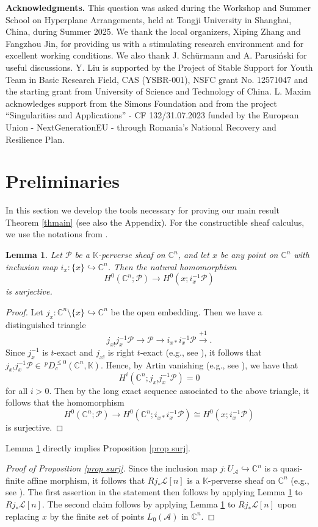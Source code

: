 \documentclass[12pt,leqno,twoside]{amsart}
\theoremstyle{plain}
\newtheorem{lemma}[theorem]{Lemma}
\theoremstyle{definition}
\newcommand{\C}{\mathbb{C}}
\newcommand{\K}{\mathbb{K}}
\newcommand{\sA}{\mathcal{A}}
\newcommand{\sL}{\mathcal{L}}
\newcommand{\sP}{\mathcal{P}}
\begin{document}
{\bf Acknowledgments.} This question was asked during the Workshop and Summer School on Hyperplane Arrangements, held at Tongji University in Shanghai, China, during Summer 2025. We thank the local organizers, Xiping Zhang and Fangzhou Jin, for providing us with a stimulating research environment and for excellent working conditions. We also thank J. Sch\"urmann and A. Parusi\'nski for useful discussions.
Y. Liu is supported by the Project of Stable Support for Youth Team in Basic Research Field, CAS (YSBR-001), NSFC grant No. 12571047 and  the starting grant from University of Science and Technology of China. 
L. Maxim 
acknowledges support from the Simons Foundation and from the project ``Singularities and Applications'' - CF 132/31.07.2023 funded by the European Union - NextGenerationEU - through Romania's National Recovery and Resilience Plan. 

\section{Preliminaries}
In this section we develop the tools necessary for proving our main result Theorem \ref{thmain} (see also the Appendix). For the constructible sheaf calculus, we use the notations from \cite{Dim04,MS}. 

\begin{lemma} \label{lemma 1}
Let $\sP$ be a $\K$-perverse sheaf on $\C^{n}$, and let $x$ be any point on $\C^{n}$ with inclusion map  $i_x: \{x\}\hookrightarrow \C^{n}$. Then the natural homomorphism 
\[
H^0(\C^{n}; \sP)\to H^0(x; i_x^{-1}\sP)
\]
is surjective. 
\end{lemma}
\begin{proof}
Let $j_x: \C^{n}\setminus \{x\}\hookrightarrow \C^{n}$ be the open embedding. Then we have a distinguished triangle
\[
j_{x!}j_x^{-1}\sP\to \sP\to i_{x*}i_x^{-1}\sP\xrightarrow{+1} .
\]
Since $j_x^{-1}$ is $t$-exact and $j_{x!}$ is right $t$-exact (e.g., see \cite[Theorem 5.2.4]{Dim04}), it follows that $j_{x!}j_x^{-1}\sP\in \,^p D_c^{\leq 0}(\C^{n},\K)$. Hence, by Artin vanishing (e.g., see \cite[Theorem 10.3.59]{MS}), we have that
\[
H^i(\C^{n}; j_{x!}j_x^{-1}\sP)=0
\]
for all $i>0$. Then by the long exact sequence associated to the above triangle, it follows that the homomorphism
\[
H^0(\C^{n}; \sP)\to H^0(\C^{n}; i_{x*}i_x^{-1}\sP)\cong H^0(x; i_x^{-1}\sP)
\]
is surjective. 
\end{proof}

 Lemma \ref{lemma 1} directly implies Proposition \ref{prop surj}.
\begin{proof}[Proof of Proposition \ref{prop surj}]
Since the inclusion map $j\colon U_\sA \hookrightarrow \C^n$ is a quasi-finite affine morphism, it follows that $Rj_* \sL[n]$ is a $\K$-perverse sheaf on $\C^n$ (e.g., see \cite[Corollary~5.2.17]{Dim04}).
  The first assertion in the statement then follows by applying Lemma \ref{lemma 1} to $Rj_* \sL[n]$. The second claim follows by applying Lemma \ref{lemma 1} to $Rj_* \sL[n]$ upon replacing $x$ by the finite set of points $L_0(\sA)$ in $\C^n$.
\end{proof}
\end{document}

